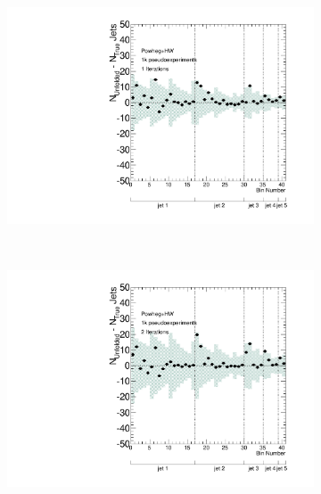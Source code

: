 
\begin{figure}
\begin{subfigure}[]{0.5\textwidth}
\includegraphics[width=\textwidth]{fig/Stress/105860atlfast/Bias1Iterations.pdf}
\end{subfigure}
~
\begin{subfigure}[]{0.5\textwidth}
\includegraphics[width=\textwidth]{fig/Stress/105860atlfast/Bias2Iterations.pdf}

\end{subfigure}
\end{figure}
